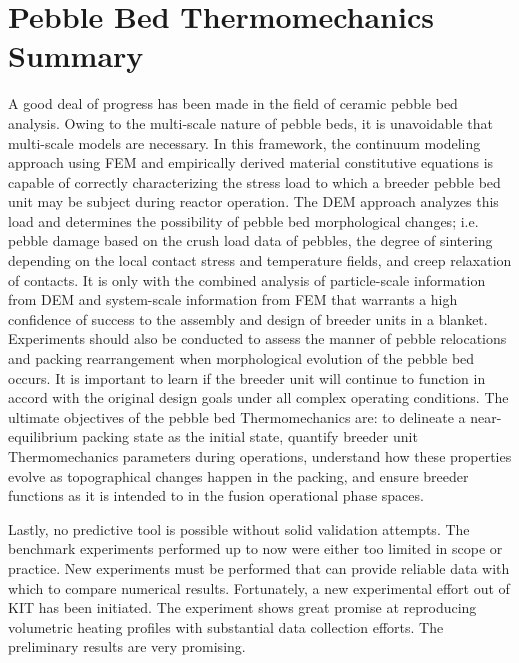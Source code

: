 \section{Pebble Bed Thermomechanics Summary}
A good deal of progress has been made in the field of ceramic pebble bed analysis. Owing to the multi-scale nature of pebble beds, it is unavoidable that multi-scale models are necessary. In this framework, the continuum modeling approach using FEM and empirically derived material constitutive equations is capable of correctly characterizing the stress load to which a breeder pebble bed unit may be subject during reactor operation. The DEM approach analyzes this load and determines the possibility of pebble bed morphological changes; i.e. pebble damage based on the crush load data of pebbles, the degree of sintering depending on the local contact stress and temperature fields, and creep relaxation of contacts. It is only with the combined analysis of particle-scale information from DEM and system-scale information from FEM that warrants a high confidence of success to the assembly and design of breeder units in a blanket.  Experiments should also be conducted to assess the manner of pebble relocations and packing rearrangement when morphological evolution of the pebble bed occurs. It is important to learn if the breeder unit will continue to function in accord with the original design goals under all complex operating conditions.  The ultimate objectives of the pebble bed Thermomechanics are: to delineate a near-equilibrium packing state as the initial state, quantify breeder unit Thermomechanics parameters during operations, understand how these properties evolve as topographical changes happen in the packing, and ensure breeder functions as it is intended to in the fusion operational phase spaces.


Lastly, no predictive tool is possible without solid validation attempts. The benchmark experiments performed up to now were either too limited in scope or practice. New experiments must be performed that can provide reliable data with which to compare numerical results. Fortunately, a new experimental effort out of KIT has been initiated.\cite{Hernandez2014} The experiment shows great promise at reproducing volumetric heating profiles with substantial data collection efforts. The preliminary results are very promising.


